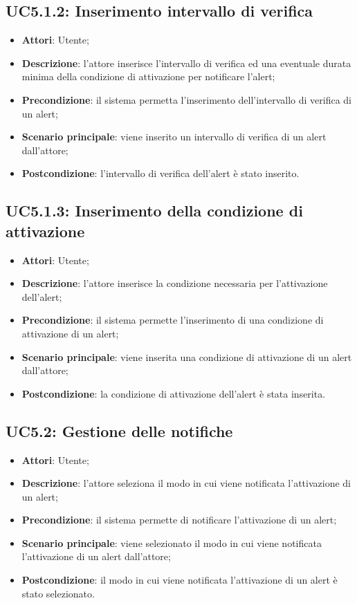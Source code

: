 \subsection{UC5.1.2: Inserimento intervallo di verifica}
\hypertarget{UC5.1.2}{}
\begin{itemize}
	\item \textbf{Attori}: Utente;
	\item \textbf{Descrizione}: l'attore inserisce l'intervallo di verifica ed una eventuale durata minima della condizione di attivazione per notificare l'alert;
	\item \textbf{Precondizione}: il sistema permetta l'inserimento dell'intervallo di verifica di un alert;
	\item \textbf{Scenario principale}: viene inserito un intervallo di verifica di un alert dall'attore;
	\item \textbf{Postcondizione}: l'intervallo di verifica dell'alert è stato inserito.
\end{itemize}

\subsection{UC5.1.3: Inserimento della condizione di attivazione}
\hypertarget{UC5.1.3}{}
\begin{itemize}
	\item \textbf{Attori}: Utente;
	\item \textbf{Descrizione}: l'attore inserisce la condizione necessaria per l'attivazione dell'alert;
	\item \textbf{Precondizione}: il sistema permette l'inserimento di una condizione di attivazione di un alert;
	\item \textbf{Scenario principale}: viene inserita una condizione di attivazione di un alert dall'attore;
	\item \textbf{Postcondizione}: la condizione di attivazione dell'alert è stata inserita.
\end{itemize}

\subsection{UC5.2: Gestione delle notifiche}
\hypertarget{UC5.2}{}
\begin{itemize}
	\item \textbf{Attori}: Utente;
	\item \textbf{Descrizione}: l'attore seleziona il modo in cui viene notificata l'attivazione di un alert;
	\item \textbf{Precondizione}: il sistema permette di notificare l'attivazione di un alert;
	\item \textbf{Scenario principale}: viene selezionato il modo in cui viene notificata l'attivazione di un alert dall'attore;
	\item \textbf{Postcondizione}: il modo in cui viene notificata l'attivazione di un alert è stato selezionato.
\end{itemize}
